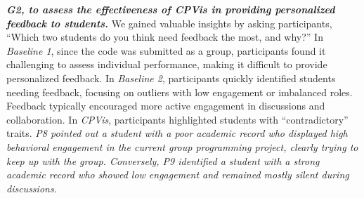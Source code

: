 \textbf{\textit{G2, to assess the effectiveness of \textit{CPVis} in providing personalized feedback to students.}}
We gained valuable insights by asking participants, ``Which two students do you think need feedback the most, and why?''
In \textit{Baseline 1}, since the code was submitted as a group, participants found it challenging to assess individual performance, making it difficult to provide personalized feedback.
In \textit{Baseline 2}, participants quickly identified students needing feedback, focusing on outliers with low engagement or imbalanced roles. Feedback typically encouraged more active engagement in discussions and collaboration.
In \textit{CPVis}, participants highlighted students with ``contradictory'' traits. \textit{P8 pointed out a student with a poor academic record who displayed high behavioral engagement in the current group programming project, clearly trying to keep up with the group. Conversely, P9 identified a student with a strong academic record who showed low engagement and remained mostly silent during discussions.}



